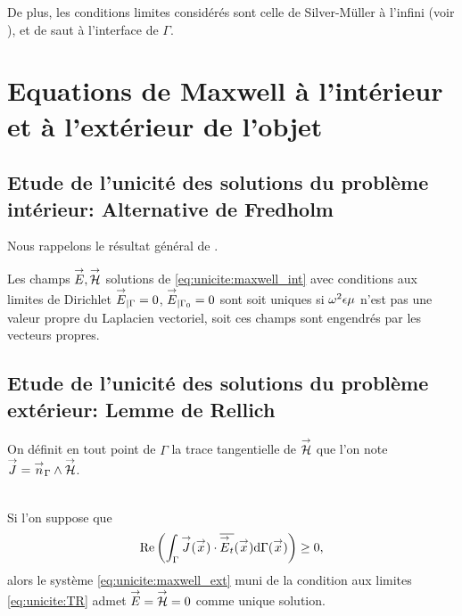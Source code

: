De plus, les conditions limites considérés sont celle de Silver-Müller à l'infini (voir \cite[eq (5.2.24), p.~183]{nedelec_acoustic_2001}), et de saut à l'interface de \(\Gamma\).

\section{Equations de Maxwell à l'intérieur et à l'extérieur de l'objet}

    \subsection{Etude de l'unicité des solutions du problème intérieur: Alternative de Fredholm}

        Nous rappelons le résultat général de \cite[Théorème~8, p.~111]{cessenat_mathematical_1996}.
        \begin{thm}
            Les champs \({\overset{\rightarrow}{E}},{\overset{\rightarrow}{\mathcal{H}}}\) solutions de \eqref{eq:unicite:maxwell_int} avec conditions aux limites de Dirichlet \({\overset{\rightarrow}{E}}_{|\Gamma} = 0\), \({\overset{\rightarrow}{E}}_{|\Gamma_0} = 0\) sont soit uniques si \(\omega^2\epsilon\mu\) n'est pas une valeur propre du Laplacien vectoriel, soit ces champs sont engendrés par les vecteurs propres.
        \end{thm}

    \subsection{Etude de l'unicité des solutions du problème extérieur: Lemme de Rellich}

        On définit en tout point de \(\Gamma\) la trace tangentielle de \({\overset{\rightarrow}{\mathcal{H}}}\) que l'on note \({\overset{\rightarrow}{J}} = {\overset{\rightarrow}{n}}_\Gamma \wedge {\overset{\rightarrow}{\mathcal{H}}}\).
        \begin{prop}~\\
        Si l'on suppose que
        \begin{equation}
            \label{eq:unicite:form_var:cgu}
            \operatorname{Re}\left(\int_\Gamma {\overset{\rightarrow}{J}}({\overset{\rightarrow}{x}}) \cdot {\overline{{\overset{\rightarrow}{E}}_t}}({\overset{\rightarrow}{x}}) \mathrm{d}{\Gamma({\overset{\rightarrow}{x}})}\right) \ge 0,
        \end{equation}
        alors le système \eqref{eq:unicite:maxwell_ext} muni de la condition aux limites \eqref{eq:unicite:TR} admet \({\overset{\rightarrow}{E}}={\overset{\rightarrow}{\mathcal{H}}}=0\) comme unique solution.
        \end{prop}
    

